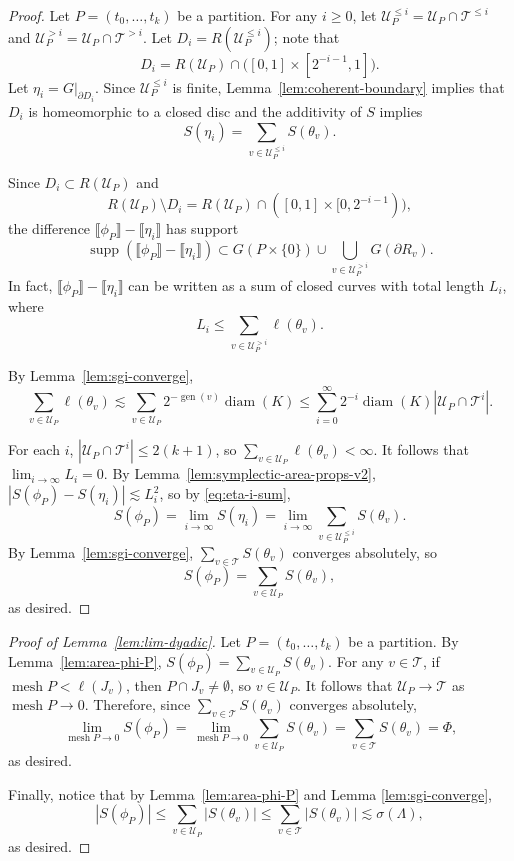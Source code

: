 \documentclass[12pt,reqno]{amsart}
\newcommand{\fcl}[1]{\llbracket{#1}\rrbracket}
\newcommand{\cT}{\mathcal{T}}
\newcommand{\cU}{\mathcal{U}}
\DeclareMathOperator{\mesh}{mesh}
\DeclareMathOperator{\gen}{gen}
\theoremstyle{remark}
\newcommand{\0}{\mathbf{0}}
\renewcommand{\1}{\mathbf 1}
\DeclareMathOperator{\diam}{diam}
\DeclareMathOperator{\supp}{supp}
\begin{document}
\begin{proof}
  Let $P=(t_0,\dots, t_k)$ be a partition. For any $i\ge 0$, let $\cU_P^{\le i } = \cU_P\cap \cT^{\le i}$ and $\cU_P^{> i } = \cU_P\cap \cT^{> i}$. Let $D_i = R(\cU_P^{\le i})$; note that
  $$D_i = R(\cU_P) \cap \big([0,1]\times [2^{-i-1},1]\big).$$
  Let $\eta_{i} = G|_{\partial D_i}$. 
  Since $\cU_P^{\le i}$ is finite, Lemma~\ref{lem:coherent-boundary} implies that
  $D_i$ is homeomorphic to a closed disc and the additivity of $S$ implies
  \begin{equation}\label{eq:eta-i-sum}
    S(\eta_i) = \sum_{v\in \cU_P^{\le i}} S(\theta_v).
  \end{equation}
  
  Since $D_i \subset R(\cU_P)$ and 
  $$R(\cU_P)\setminus D_i = R(\cU_P) \cap ([0,1]\times [0,2^{-i-1})),$$
  the difference $\fcl{\phi_P} - \fcl{\eta_i}$ has support
  $$
  \supp(\fcl{\phi_P} - \fcl{\eta_i}) \subset G(P\times \{0\}) \cup \bigcup_{v\in \cU_P^{>i}} G(\partial R_v).
  $$
  In fact, $\fcl{\phi_P} - \fcl{\eta_i}$ can be written as a sum of closed curves with total length $L_i$, where
  $$L_i \le \sum_{v\in \cU_P^{>i}} \ell(\theta_v).
  $$

  By Lemma~\ref{lem:sgi-converge},
  \begin{equation}\label{eq:area-phi-P-sum}
    \sum_{v\in \cU_P} \ell(\theta_v) \lesssim \sum_{v\in \cU_P} 2^{-\gen(v)} \diam(K) \le \sum_{i=0}^\infty 2^{-i} \diam(K) |\cU_P\cap \cT^i|.
  \end{equation}
    
  For each $i$, $|\cU_P\cap \cT^i|\le 2(k+1)$, so $\sum_{v\in \cU_P} \ell(\theta_v) < \infty$. It follows that $\lim_{i\to \infty} L_i = 0$. By Lemma~\ref{lem:symplectic-area-props-v2}, $|S(\phi_P) - S(\eta_i)| \lesssim L_i^2$, so by \eqref{eq:eta-i-sum}, 
  $$S(\phi_P) = \lim_{i\to\infty} S(\eta_i) = \lim_{i\to \infty} \sum_{v\in \cU_P^{\le i}} S(\theta_v).$$
  By Lemma~\ref{lem:sgi-converge}, $\sum_{v\in \cT} S(\theta_v)$ converges absolutely, so
  $$S(\phi_P) = \sum_{v\in \cU_P} S(\theta_v),$$
  as desired.
\end{proof}

\begin{proof}[Proof of Lemma~\ref{lem:lim-dyadic}] 
  Let $P=(t_0,\dots,t_k)$ be a partition. By Lemma~\ref{lem:area-phi-P}, $S(\phi_P) = \sum_{v\in \cU_P} S(\theta_v)$. For any $v\in \cT$, if $\mesh P < \ell(J_v)$, then $P\cap J_v\ne \emptyset$, so $v\in \cU_P$. It follows that $\cU_P\to \cT$ as $\mesh P \to 0$. Therefore, since $\sum_{v\in \cT} S(\theta_v)$ converges absolutely,
  $$\lim_{\mesh P \to 0} S(\phi_P) = \lim_{\mesh P\to 0}\sum_{v\in \cU_P} S(\theta_v) = \sum_{v\in \cT} S(\theta_v) = \Phi,$$
  as desired.

  Finally, notice that by Lemma~\ref{lem:area-phi-P} and Lemma \ref{lem:sgi-converge},
  \[
  |S(\phi_P)|\le \sum_{v\in \cU_P} |S(\theta_v)| \leq \sum_{v\in \cT} |S(\theta_v)|\lesssim \sigma(\Lambda),
  \]
  as desired.
\end{proof}
\end{document}

